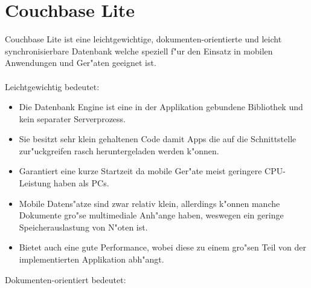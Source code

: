\documentclass[a4paper,14pt]{scrreprt}
\begin{document}
 
\chapter{Couchbase Lite}
Couchbase Lite ist eine leichtgewichtige, dokumenten-orientierte und leicht synchronisierbare Datenbank welche speziell f"ur den Einsatz in mobilen Anwendungen und Ger"aten geeignet ist.\\\\  Leichtgewichtig bedeutet:

\begin{itemize}
\item Die Datenbank Engine ist eine in der Applikation gebundene Bibliothek und kein separater Serverprozess.
\item Sie besitzt sehr klein gehaltenen Code damit Apps die auf die Schnittstelle zur"uckgreifen rasch heruntergeladen werden k"onnen.
\item Garantiert eine kurze Startzeit da mobile Ger"ate meist geringere CPU-Leistung haben als PCs.
\item Mobile Datens"atze sind zwar relativ klein, allerdings k"onnen manche Dokumente gro"se multimediale Anh"ange haben, weswegen ein geringe Speicherauslastung von N"oten ist.
\item Bietet auch eine gute Performance, wobei diese zu einem gro"sen Teil von der implementierten Applikation abh"angt.
\end{itemize}
Dokumenten-orientiert bedeutet:
\end{document}
